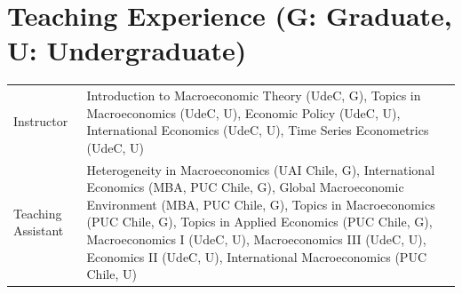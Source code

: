 \documentclass[10pt]{article}
\begin{document}
\section*{Teaching Experience (\footnotesize G: Graduate, U: Undergraduate)}
\begin{tabular}{@{}p{1.8cm}p{13cm}}
Instructor& Introduction to Macroeconomic Theory (UdeC, G), Topics in Macroeconomics (UdeC, U), Economic Policy (UdeC, U), International Economics (UdeC, U), Time Series Econometrics (UdeC, U)\\
Teaching Assistant& Heterogeneity in Macroeconomics (UAI Chile, G), International Economics (MBA, PUC Chile, G), Global Macroeconomic Environment (MBA, PUC Chile, G), Topics in Macroeconomics (PUC Chile, G), Topics in Applied Economics (PUC Chile, G), Macroeconomics I (UdeC, U), Macroeconomics III (UdeC, U), Economics II (UdeC, U), International Macroeconomics (PUC Chile, U)
\end{tabular}
\end{document}
